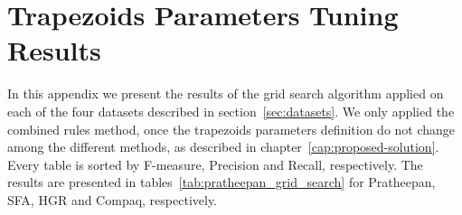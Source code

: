 \chapter{Trapezoids Parameters Tuning Results}
\label{ape:trapezoids_parameters_tuning}

In this appendix we present the results of the grid search algorithm applied on each of the four datasets described in section~\ref{sec:datasets}. We only applied the combined rules method, once the trapezoids parameters definition do not change among the different methods, as described in chapter~\ref{cap:proposed-solution}. Every table is sorted by F-measure, Precision and Recall, respectively. The results are presented in tables~\ref{tab:pratheepan_grid_search} for Pratheepan, SFA, HGR and Compaq, respectively.


\singlespacing

